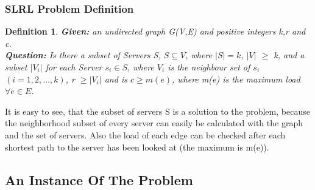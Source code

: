 \documentclass [12pt]{article}
\newtheorem{mydef}{Definition}
\begin{document}
\subsubsection{SLRL Problem Definition}

\begin{mydef}
  {\itshape \textbf{Given:} an undirected graph G(V,E) and  positive integers k,r and c.\\
    \textbf{Question:} 
    Is there a subset of Servers S, $S \subseteq V$, where $|S| = k$, $|V|$ $\geq$ k,
    and a subset $|V_i|$ for each Server $s_i \in S$, where $V_i$ is the neighbour set of $s_i$ $(i=1,2,\dots,k)$, r $\geq  |V_i|$ 
  and is $c \geq m(e)$, where m(e) is the maximum load $\forall e \in E$.} 

\end{mydef}

It is easy to see, that the subset of servers S is a solution to the problem, because the neighborhood subset
of every server can easily be calculated with the graph and the set of servers. Also the load of each edge
can be checked after each shortest path to the server has been looked at (the maximum is m(e)).

\subsection{An Instance Of The Problem}
\indent
\indent
\indent
\end{document}
